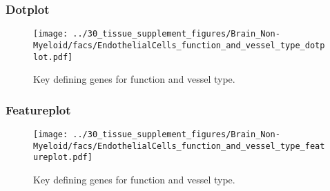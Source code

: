 \clearpage

\subsubsection{Dotplot}
\begin{figure}[h]
\centering
\texttt{[image: ../30\_tissue\_supplement\_figures/Brain\_Non-Myeloid/facs/EndothelialCells\_function\_and\_vessel\_type\_dotplot.pdf]}

\caption{Key defining genes for function and vessel type.
}
\end{figure}


\clearpage

\subsubsection{Featureplot}
\begin{figure}[h]
\centering
\texttt{[image: ../30\_tissue\_supplement\_figures/Brain\_Non-Myeloid/facs/EndothelialCells\_function\_and\_vessel\_type\_featureplot.pdf]}

\caption{Key defining genes for function and vessel type.
}
\end{figure}

